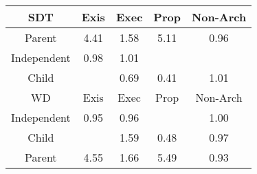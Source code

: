 \begin{tabular}{|c||c|c|c|c|}
\hline
\hline
SDT & Exis & Exec & Prop & Non-Arch \\ 
\hline
Parent & \cellcolor[rgb]{0.7395306093313926,0.7592513412622386,0.42} 4.41 & \cellcolor[rgb]{0.8811774200123204,0.8263471989532044,0.42} 1.58 & \cellcolor[rgb]{0.7044841820448957,0.7426504020212664,0.42} 5.11 & \cellcolor[rgb]{0.9031641338354142,0.8076435668209602,0.4136198582463865} 0.96 \\ 
\hline
Independent & \cellcolor[rgb]{0.9055840482296434,0.8190978282869787,0.41587844501433385} 0.98 & \cellcolor[rgb]{0.909498525542766,0.839762459467626,0.42} 1.01 &  &  \\ 
\hline
Child &  & \cellcolor[rgb]{0.851687028766575,0.5639852694951216,0.3655745601821367} 0.69 & \cellcolor[rgb]{0.7990260691407218,0.3147233939327495,0.31642433119800695} 0.41 & \cellcolor[rgb]{0.9094220368554272,0.8397262279841498,0.42} 1.01 \\ 
\hline
\hline
WD & Exis & Exec & Prop & Non-Arch \\ 
\hline
Independent & \cellcolor[rgb]{0.9015623873633671,0.8000619668532707,0.4121248948724759} 0.95 & \cellcolor[rgb]{0.903304227584184,0.8083066772318046,0.41375061241190514} 0.96 &  & \cellcolor[rgb]{0.9098885125550528,0.8399471901576565,0.42} 1.00 \\ 
\hline
Child &  & \cellcolor[rgb]{0.8806849268166119,0.8261139127026056,0.42} 1.59 & \cellcolor[rgb]{0.8135084566858346,0.3832733616462837,0.3299412262401123} 0.48 & \cellcolor[rgb]{0.9041363647912898,0.8122454600121051,0.4145272738052038} 0.97 \\ 
\hline
Parent & \cellcolor[rgb]{0.7325339226596911,0.7559371212598536,0.42} 4.55 & \cellcolor[rgb]{0.8768171968466951,0.8242818300852764,0.41999999999999993} 1.66 & \cellcolor[rgb]{0.6857261578218794,0.7337650221261535,0.42} 5.49 & \cellcolor[rgb]{0.8976922441368267,0.781743288914313,0.4085127611943715} 0.93 \\ 
\hline
\end{tabular}
